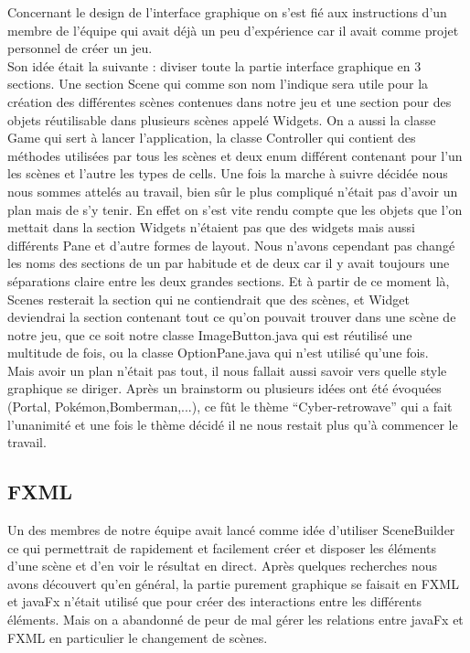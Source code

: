 \documentclass[../main.tex]{subfiles}
\begin{document}
Concernant le design de l’interface graphique on s’est fié aux instructions d’un membre de l’équipe qui avait déjà un peu d’expérience car il avait comme projet personnel de créer un jeu. \\
Son idée était la suivante : diviser toute la partie interface graphique en 3 sections. 
Une section Scene qui comme son nom l’indique sera utile pour la création des différentes scènes contenues dans notre jeu et une section pour des objets réutilisable dans plusieurs scènes appelé Widgets.
On a aussi la classe Game qui sert à lancer l’application, la classe Controller qui contient des méthodes utilisées par tous les scènes et deux enum différent contenant pour l’un les scènes et l’autre les types de cells.
Une fois la marche à suivre décidée nous nous sommes attelés au travail, bien sûr le plus compliqué n'était pas d’avoir un plan mais de s’y tenir. 
En effet on s’est vite rendu compte que les objets que l’on mettait dans la section Widgets n’étaient pas que des widgets mais aussi différents Pane et d’autre formes de layout.
Nous n'avons cependant pas changé les noms des sections de un par habitude et de deux car il y avait toujours une séparations claire entre les deux grandes sections. 
Et à partir de ce moment là, Scenes resterait la section qui ne contiendrait que des scènes, et Widget deviendrai la section contenant tout ce qu’on pouvait trouver dans une scène de notre jeu,
que ce soit notre classe ImageButton.java qui est réutilisé une multitude de fois, ou la classe OptionPane.java qui n’est utilisé qu’une fois. \\

Mais avoir un plan n'était pas tout, il nous fallait aussi savoir vers quelle style graphique se diriger. 
Après un brainstorm ou plusieurs idées ont été évoquées (Portal, Pokémon,Bomberman,...), ce fût le thème “Cyber-retrowave” qui a fait l’unanimité  et une fois le thème décidé il ne nous restait plus qu'à commencer le travail.

\subsection{FXML}
Un des membres de notre équipe avait lancé comme idée d’utiliser SceneBuilder ce qui permettrait de rapidement et facilement créer et disposer les éléments d’une scène et d’en voir le résultat en direct.
Après quelques recherches nous avons découvert qu’en général, la partie purement graphique se faisait en FXML et javaFx n'était utilisé que pour créer des interactions entre les différents éléments.
Mais on a abandonné de peur de mal gérer les relations entre javaFx et FXML en particulier le changement de scènes.
\end{document}
